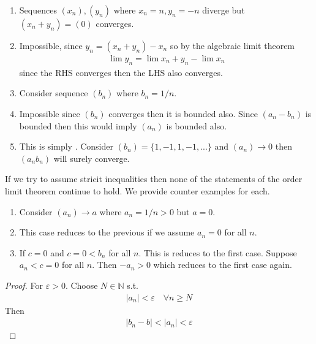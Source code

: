 \begin{enumerate}[label=(\alph*)]
    \item 
    Sequences $(x_n), (y_n)$ where $x_n=n, y_n=-n$ diverge but 
    $(x_n+y_n) = (0)$ converges.

    \item 
    Impossible, since $y_n = (x_n + y_n) - x_n$ so by the algebraic limit 
    theorem
    \begin{align*}
        \lim y_n = \lim{x_n+y_n} - \lim x_n
    \end{align*}
    since the RHS converges then the LHS also converges.
    
    \item
    Consider sequence $(b_n) $ where $b_n = 1/n$.

    \item 
    Impossible since $(b_n)$ converges then it is bounded also. Since $(a_n-b_n)$ is bounded
    then this would imply $(a_n)$ is bounded also.

    \item 
    This is simply . Consider $(b_n) = \{1,-1,1,-1,...\}$ and 
    $(a_n)\rightarrow 0$ then $(a_nb_n)$ will surely converge.
\end{enumerate}

If we try to assume stricit inequalities then none of the statements of the
order limit theorem continue to hold. We provide counter examples for each.
\begin{enumerate}[label=(\roman*)]
    \item 
    Consider $(a_n)\rightarrow a$ where $a_n = 1/n > 0$ but $a=0$.
    
    \item 
    This case reduces to the previous if we assume $a_n=0$ for all $n$.

    \item 
    If $c=0$ and $c = 0 < b_n$ for all $n$. This is reduces to the first case.
    Suppose $a_n <c =  0$ for all $n$. Then $-a_n > 0$ which reduces to the 
    first case again.
\end{enumerate}

\begin{proof}
    For $\varepsilon > 0$. Choose $N \in \mathbb{N}$ s.t. 
    \begin{align*}
        |a_n| < \varepsilon \quad \forall n \geq N
    \end{align*}
    Then
    \begin{align*}
        |b_n - b| < |a_n| < \varepsilon
    \end{align*}
\end{proof}

